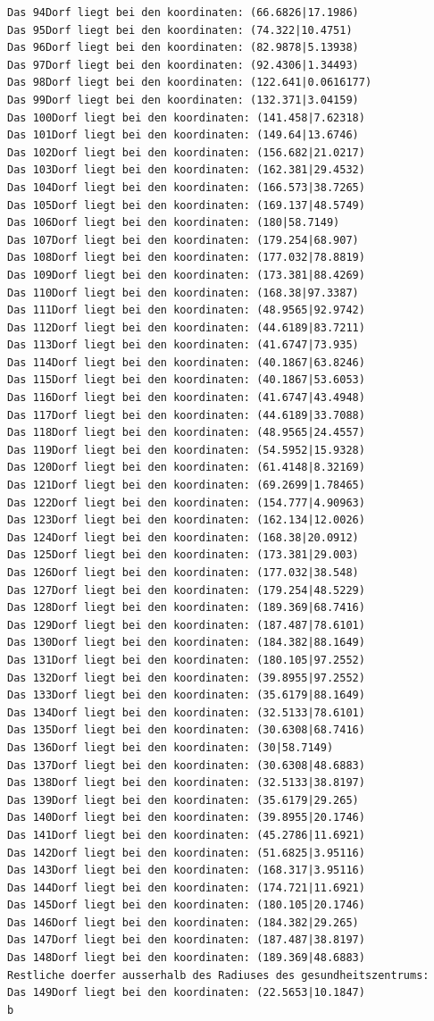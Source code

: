 \documentclass{article}
\begin{document}
\begin{verbatim}
Das 94Dorf liegt bei den koordinaten: (66.6826|17.1986)
Das 95Dorf liegt bei den koordinaten: (74.322|10.4751)
Das 96Dorf liegt bei den koordinaten: (82.9878|5.13938)
Das 97Dorf liegt bei den koordinaten: (92.4306|1.34493)
Das 98Dorf liegt bei den koordinaten: (122.641|0.0616177)
Das 99Dorf liegt bei den koordinaten: (132.371|3.04159)
Das 100Dorf liegt bei den koordinaten: (141.458|7.62318)
Das 101Dorf liegt bei den koordinaten: (149.64|13.6746)
Das 102Dorf liegt bei den koordinaten: (156.682|21.0217)
Das 103Dorf liegt bei den koordinaten: (162.381|29.4532)
Das 104Dorf liegt bei den koordinaten: (166.573|38.7265)
Das 105Dorf liegt bei den koordinaten: (169.137|48.5749)
Das 106Dorf liegt bei den koordinaten: (180|58.7149)
Das 107Dorf liegt bei den koordinaten: (179.254|68.907)
Das 108Dorf liegt bei den koordinaten: (177.032|78.8819)
Das 109Dorf liegt bei den koordinaten: (173.381|88.4269)
Das 110Dorf liegt bei den koordinaten: (168.38|97.3387)
Das 111Dorf liegt bei den koordinaten: (48.9565|92.9742)
Das 112Dorf liegt bei den koordinaten: (44.6189|83.7211)
Das 113Dorf liegt bei den koordinaten: (41.6747|73.935)
Das 114Dorf liegt bei den koordinaten: (40.1867|63.8246)
Das 115Dorf liegt bei den koordinaten: (40.1867|53.6053)
Das 116Dorf liegt bei den koordinaten: (41.6747|43.4948)
Das 117Dorf liegt bei den koordinaten: (44.6189|33.7088)
Das 118Dorf liegt bei den koordinaten: (48.9565|24.4557)
Das 119Dorf liegt bei den koordinaten: (54.5952|15.9328)
Das 120Dorf liegt bei den koordinaten: (61.4148|8.32169)
Das 121Dorf liegt bei den koordinaten: (69.2699|1.78465)
Das 122Dorf liegt bei den koordinaten: (154.777|4.90963)
Das 123Dorf liegt bei den koordinaten: (162.134|12.0026)
Das 124Dorf liegt bei den koordinaten: (168.38|20.0912)
Das 125Dorf liegt bei den koordinaten: (173.381|29.003)
Das 126Dorf liegt bei den koordinaten: (177.032|38.548)
Das 127Dorf liegt bei den koordinaten: (179.254|48.5229)
Das 128Dorf liegt bei den koordinaten: (189.369|68.7416)
Das 129Dorf liegt bei den koordinaten: (187.487|78.6101)
Das 130Dorf liegt bei den koordinaten: (184.382|88.1649)
Das 131Dorf liegt bei den koordinaten: (180.105|97.2552)
Das 132Dorf liegt bei den koordinaten: (39.8955|97.2552)
Das 133Dorf liegt bei den koordinaten: (35.6179|88.1649)
Das 134Dorf liegt bei den koordinaten: (32.5133|78.6101)
Das 135Dorf liegt bei den koordinaten: (30.6308|68.7416)
Das 136Dorf liegt bei den koordinaten: (30|58.7149)
Das 137Dorf liegt bei den koordinaten: (30.6308|48.6883)
Das 138Dorf liegt bei den koordinaten: (32.5133|38.8197)
Das 139Dorf liegt bei den koordinaten: (35.6179|29.265)
Das 140Dorf liegt bei den koordinaten: (39.8955|20.1746)
Das 141Dorf liegt bei den koordinaten: (45.2786|11.6921)
Das 142Dorf liegt bei den koordinaten: (51.6825|3.95116)
Das 143Dorf liegt bei den koordinaten: (168.317|3.95116)
Das 144Dorf liegt bei den koordinaten: (174.721|11.6921)
Das 145Dorf liegt bei den koordinaten: (180.105|20.1746)
Das 146Dorf liegt bei den koordinaten: (184.382|29.265)
Das 147Dorf liegt bei den koordinaten: (187.487|38.8197)
Das 148Dorf liegt bei den koordinaten: (189.369|48.6883)
Restliche doerfer ausserhalb des Radiuses des gesundheitszentrums: 
Das 149Dorf liegt bei den koordinaten: (22.5653|10.1847)
b
\end{verbatim}
\end{document}
